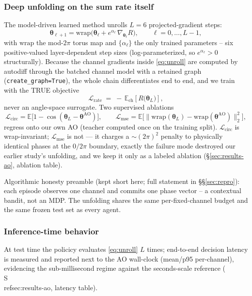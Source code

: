 \subsubsection{Deep unfolding on the sum rate itself}
The model-driven learned method unrolls $L=6$ projected-gradient steps:
\begin{equation}\label{eq:unroll}
\boldsymbol\theta_{\ell+1} = \mathrm{wrap}\!\Big(
\boldsymbol\theta_\ell + e^{\alpha_\ell}\,
\nabla_{\!\boldsymbol\theta_\ell} R\Big),
\qquad \ell = 0,\dots, L-1,
\end{equation}
with $\mathrm{wrap}$ the mod-$2\pi$ torus map and $\{\alpha_\ell\}$ the only
trained parameters -- six positive-valued layer-dependent step sizes
(log-parameterized, so $e^{\alpha_\ell}>0$ structurally).
Because the channel gradients inside \eqref{eq:unroll} are computed by
autodiff through the batched channel model with a retained graph
(\texttt{create\_graph=True}), the whole chain differentiates end to end, and
we train with the TRUE objective
\begin{equation}\label{eq:lossrate}
\mathcal L_{\mathrm{rate}} \;=\; -\,\mathbb E_{\mathrm{ch}}\!\left[R\!\big(\boldsymbol\theta_L\big)\right],
\end{equation}
never an angle-space surrogate. Two supervised ablations
\begin{equation}\label{eq:ablation}
\mathcal L_{\mathrm{circ}} = \mathbb E\big[1-\cos(\boldsymbol\theta_L - \boldsymbol\theta^{\mathrm{AO}})\big],
\qquad
\mathcal L_{\mathrm{mse}} = \mathbb E\big[\|\mathrm{wrap}(\boldsymbol\theta_L)-
\mathrm{wrap}(\boldsymbol\theta^{\mathrm{AO}})\|_2^2\big],
\end{equation}
regress onto our own AO (teacher computed once on the training split).
$\mathcal L_{\mathrm{circ}}$ is wrap-invariant; $\mathcal L_{\mathrm{mse}}$ is
not — it charges a $\sim(2\pi)^2$ penalty to physically identical phases at the
$0/2\pi$ boundary, exactly the failure mode destroyed our earlier study's
unfolding, and we keep it only as a labeled ablation
(§\ref{sec:results-ao}, ablation table).

Algorithmic honesty preamble (kept short here; full statement in §\S\ref{sec:repro}):
each episode observes one channel and commits one phase vector -- a contextual
bandit, not an MDP. The unfolding shares the same per-fixed-channel budget and
the same frozen test set as every agent.

\subsubsection{Inference-time behavior}
At test time the policicy evaluates \eqref{eq:unroll} $L$ times; end-to-end
decision latency is measured and reported next to the AO wall-clock
(mean/p95 per-channel), evidencing the sub-millisecond regime against the
seconds-scale reference (\\S\\ref{sec:results-ao}, latency table).
